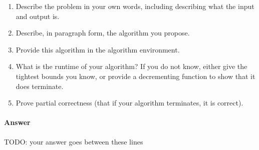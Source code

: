 \documentclass{article}
\begin{document}
\begin{enumerate}
    \item Describe the problem in your own words, including
        describing what the input and output is.
    \item Describe, in paragraph form, the algorithm you propose.
    \item Provide this algorithm in the algorithm environment.
    \item What is the runtime of your algorithm? If you do not know, either give
        the tightest bounds you know, or provide a decrementing function to show
        that it does terminate.
    \item Prove partial correctness (that if your algorithm terminates, it is
        correct).
\end{enumerate}



\paragraph{Answer}


TODO: your answer goes between these lines

\end{document}
